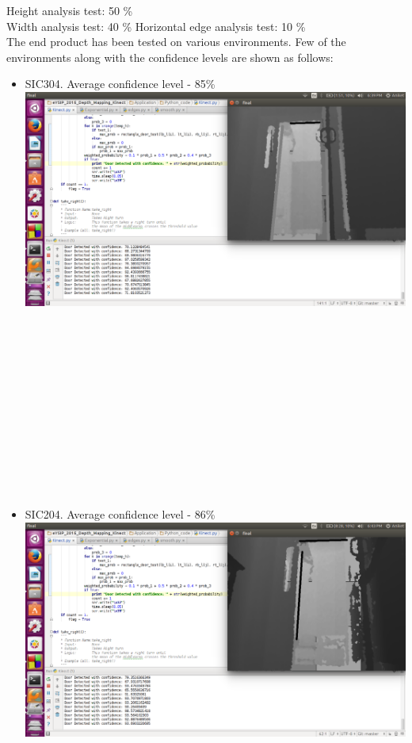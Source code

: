 \documentclass{report}
\begin{document}
Height analysis test: 50 \% \\
Width analysis test: 40 \%
Horizontal edge analysis test: 10 \% \\
The end product has been tested on various environments. Few of the environments along with the confidence levels are shown as follows:
\begin{itemize}
 \item SIC304. Average confidence level - 85\% \\
 \includegraphics[width = 15cm]{confidence_304.png} \\ \\ \\ \\ \\ \\ \\ \\ \\ \\ \\ \\ \\
 \item SIC204. Average confidence level - 86\% \\ 
 \includegraphics[width = 15cm]{confidence_204.png} \\

\end{itemize}
\end{document}
